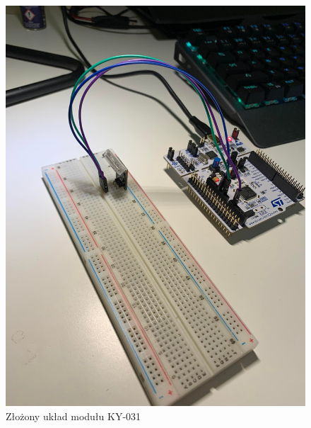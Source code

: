 \documentclass[11pt, a4paper]{article}
\begin{document}
\vspace{0.5cm}
\begin{figure}[h!]
    \centering
    \includegraphics[scale=0.1]{fig/KY-031/działanie_ukladu/uklad.jpg}
    \caption{Złożony układ modułu KY-031}
    \label{fig:my_label}
\end{figure}
\vspace{0.5cm}
\end{document}
